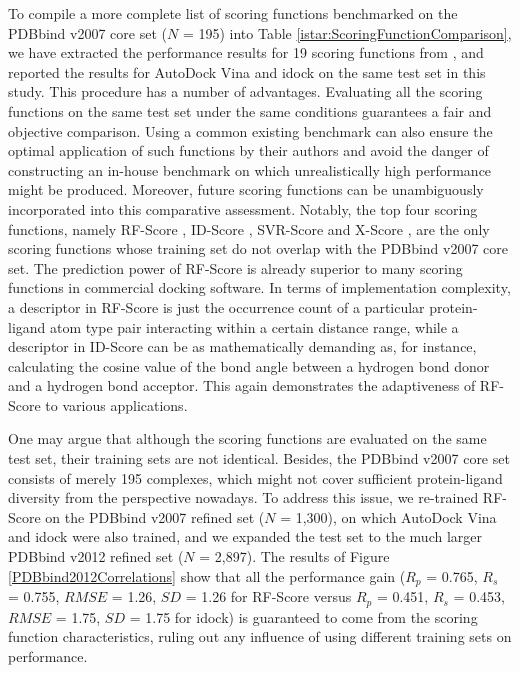 To compile a more complete list of scoring functions benchmarked on the PDBbind v2007 core set ($N$ = 195) into Table \ref{istar:ScoringFunctionComparison}, we have extracted the performance results for 19 scoring functions from \citep{1313,564,1305,1295}, and reported the results for AutoDock Vina and idock on the same test set in this study. This procedure has a number of advantages. Evaluating all the scoring functions on the same test set under the same conditions guarantees a fair and objective comparison. Using a common existing benchmark can also ensure the optimal application of such functions by their authors and avoid the danger of constructing an in-house benchmark on which unrealistically high performance might be produced. Moreover, future scoring functions can be unambiguously incorporated into this comparative assessment. Notably, the top four scoring functions, namely RF-Score \citep{564}, ID-Score \citep{1305}, SVR-Score \citep{1295} and X-Score \citep{573}, are the only scoring functions whose training set do not overlap with the PDBbind v2007 core set. The prediction power of RF-Score is already superior to many scoring functions in commercial docking software. In terms of implementation complexity, a descriptor in RF-Score is just the occurrence count of a particular protein-ligand atom type pair interacting within a certain distance range, while a descriptor in ID-Score can be as mathematically demanding as, for instance, calculating the cosine value of the bond angle between a hydrogen bond donor and a hydrogen bond acceptor. This again demonstrates the adaptiveness of RF-Score to various applications.

One may argue that although the scoring functions are evaluated on the same test set, their training sets are not identical. Besides, the PDBbind v2007 core set consists of merely 195 complexes, which might not cover sufficient protein-ligand diversity from the perspective nowadays. To address this issue, we re-trained RF-Score on the PDBbind v2007 refined set ($N$ = 1,300), on which AutoDock Vina and idock were also trained, and we expanded the test set to the much larger PDBbind v2012 refined set ($N$ = 2,897). The results of Figure \ref{PDBbind2012Correlations} show that all the performance gain ($R_p$ = 0.765, $R_s$ = 0.755, $RMSE$ = 1.26, $SD$ = 1.26 for RF-Score versus $R_p$ = 0.451, $R_s$ = 0.453, $RMSE$ = 1.75, $SD$ = 1.75 for idock) is guaranteed to come from the scoring function characteristics, ruling out any influence of using different training sets on performance.

